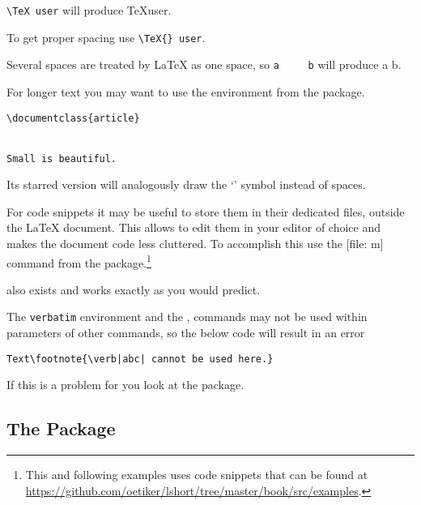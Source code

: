 \begin{chktexignore}
\begin{example}
\verb*|\TeX user| will
produce \TeX user.

To get proper spacing use
\verb*|\TeX{} user|.

Several spaces are treated
by \LaTeX{} as one space, 
so \verb*|a     b| will
produce a     b.
\end{example}
\end{chktexignore}

For longer text you may want to use the  environment from the
 package.
\begin{example}
\begin{verbatim}
\documentclass{article}


Small is beautiful.

\end{verbatim}
\end{example}
Its starred version will analogously draw the \enquote*{\textvisiblespace}
symbol instead of spaces.

For code snippets it may be useful to store them in their dedicated files,
outside the \LaTeX{} document. This allows to edit them in your editor of
choice and makes the document code less cluttered. To accomplish this use the
[file: m] command from the  package.\footnote{This
  and following examples uses code snippets that can be found at \url{https://github.com/oetiker/lshort/tree/master/book/src/examples}.}
\begin{example}[examplewidth=0.55\linewidth, vertical_mode]

\end{example}
 also exists and works exactly as you would predict.

The \texttt{verbatim} environment and the , 
commands may not be used within parameters of other commands, so the below code
will result in an error
\begin{verbatim}
Text\footnote{\verb|abc| cannot be used here.}
\end{verbatim}
If this is a problem for you look at the  package.

\subsection{The  Package}

